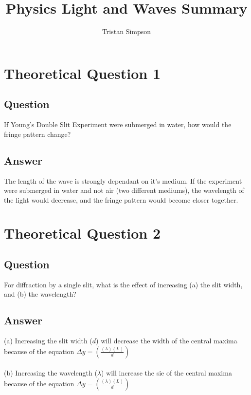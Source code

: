 \documentclass{article}
\title{Physics Light and Waves Summary}
\author{Tristan Simpson}
\begin{document}
\maketitle









\section{Theoretical Question 1}
\subsection*{Question}
If Young's Double Slit Experiment were submerged in water, how would the fringe pattern change?
\subsection*{Answer}
The length of the wave is strongly dependant on it's medium. If the experiment were submerged in water and not air (two different mediums), the wavelength of the light would decrease, and the fringe pattern would become closer together.\\

\section{Theoretical Question 2}
\subsection*{Question}
For diffraction by a single slit, what is the effect of increasing (a) the slit width, and (b) the wavelength?
\subsection*{Answer}
(a) Increasing the slit width ($d$) will decrease the width of the central maxima because of the equation $\Delta y = \left(\frac{(\lambda)(L)}{d}\right)$\\\\
(b) Increasing the wavelength ($\lambda$) will increase the sie of the central maxima because of the equation $\Delta y = \left(\frac{(\lambda)(L)}{d}\right)$\\
\end{document}
